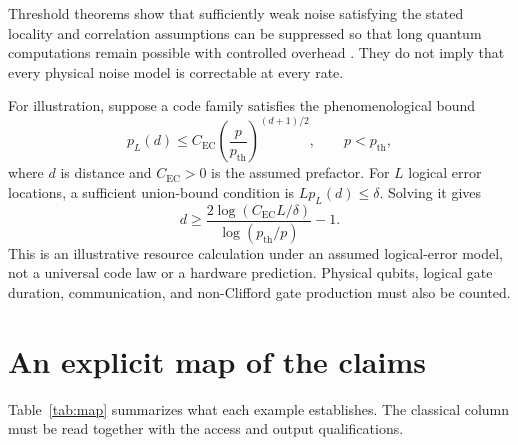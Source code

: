 \documentclass[11pt,a4paper]{article}
\theoremstyle{definition}
\theoremstyle{remark}
\numberwithin{equation}{section}
\begin{document}
Threshold theorems show that sufficiently weak noise satisfying the stated
locality and correlation assumptions can be suppressed so that long quantum
computations remain possible with controlled overhead \citep{aharonov1999}.
They do not imply that every physical noise model is correctable at every
rate.

For illustration, suppose a code family satisfies the phenomenological bound
\begin{equation}
 p_L(d)\leq C_{\mathrm{EC}}\left(\frac{p}{p_{\mathrm{th}}}\right)^{(d+1)/2},
 \qquad p<p_{\mathrm{th}},
\end{equation}
where $d$ is distance and $C_{\mathrm{EC}}>0$ is the assumed prefactor.
For $L$ logical error locations, a sufficient
union-bound condition is $Lp_L(d)\leq\delta$. Solving it gives
\begin{equation}
 d\geq\frac{2\log(C_{\mathrm{EC}}L/\delta)}{\log(p_{\mathrm{th}}/p)}-1.
\end{equation}
This is an illustrative resource calculation under an assumed logical-error
model, not a universal code law or a hardware prediction. Physical qubits,
logical gate duration, communication, and non-Clifford gate production must
also be counted.

\section{An explicit map of the claims}
Table~\ref{tab:map} summarizes what each example establishes. The classical
column must be read together with the access and output qualifications.
\end{document}
